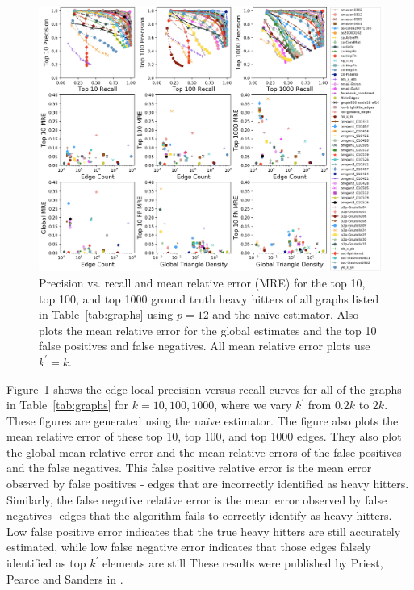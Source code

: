 \documentclass[10]{report}
\begin{document}
\begin{figure}
	\centerline{\includegraphics[width=1.0\columnwidth]{graph_challenge_plot}}
	\caption{Precision vs. recall and mean relative error (MRE) for the top 10, top 100, and top 1000 ground truth heavy hitters of all graphs listed in Table~\ref{tab:graphs} using $p=12$ and the na\"ive estimator.
	Also plots the mean relative error for the global estimates and the top 10 false positives and false negatives.
	All mean relative error plots use $k^\prime = k$.
	\label{fig:graph_challenge}}
\end{figure}

Figure~\ref{fig:graph_challenge} shows the edge local precision versus recall curves for all of the graphs in Table~\ref{tab:graphs} for $k = 10, 100, 1000$, where we vary $k^\prime$ from $0.2k$ to $2k$. 
These figures are generated using the na\"ive estimator.
The figure also plots the mean relative error of these top 10, top 100, and top 1000 edges.
They also plot the global mean relative error and the mean relative errors of the false positives and the false negatives.
This false positive relative error is the mean error observed by false positives - edges that are incorrectly identified as heavy hitters.
Similarly, the false negative relative error is the mean error observed by false negatives -edges that the algorithm fails to correctly identify as heavy hitters. 
Low false positive error indicates that the true heavy hitters are still accurately estimated, while low false negative error indicates that those edges falsely identified as top $k^\prime$ elements are still
These results were published by Priest, Pearce and Sanders in \cite{priest2018estimating}.
\end{document}
